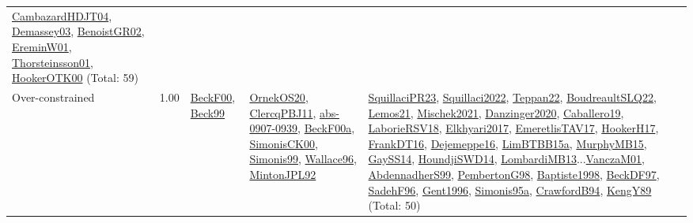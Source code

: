 {\begin{longtable}{p{3cm}r>{\raggedright\arraybackslash}p{6cm}>{\raggedright\arraybackslash}p{6cm}>{\raggedright\arraybackslash}p{8cm}}
\hyperref[detail:CambazardHDJT04]{CambazardHDJT04}, \hyperref[detail:Demassey03]{Demassey03}, \hyperref[detail:BenoistGR02]{BenoistGR02}, \hyperref[detail:EreminW01]{EreminW01}, \hyperref[detail:Thorsteinsson01]{Thorsteinsson01}, \hyperref[detail:HookerOTK00]{HookerOTK00} (Total: 59)\\
\index{Over-constrained}\index{Concepts!Over-constrained}Over-constrained &  1.00 & \hyperref[detail:BeckF00]{BeckF00}, \hyperref[detail:Beck99]{Beck99} & \hyperref[detail:OrnekOS20]{OrnekOS20}, \hyperref[detail:ClercqPBJ11]{ClercqPBJ11}, \hyperref[detail:abs-0907-0939]{abs-0907-0939}, \hyperref[detail:BeckF00a]{BeckF00a}, \hyperref[detail:SimonisCK00]{SimonisCK00}, \hyperref[detail:Simonis99]{Simonis99}, \hyperref[detail:Wallace96]{Wallace96}, \hyperref[detail:MintonJPL92]{MintonJPL92} & \hyperref[detail:SquillaciPR23]{SquillaciPR23}, \hyperref[detail:Squillaci2022]{Squillaci2022}, \hyperref[detail:Teppan22]{Teppan22}, \hyperref[detail:BoudreaultSLQ22]{BoudreaultSLQ22}, \hyperref[detail:Lemos21]{Lemos21}, \hyperref[detail:Mischek2021]{Mischek2021}, \hyperref[detail:Danzinger2020]{Danzinger2020}, \hyperref[detail:Caballero19]{Caballero19}, \hyperref[detail:LaborieRSV18]{LaborieRSV18}, \hyperref[detail:Elkhyari2017]{Elkhyari2017}, \hyperref[detail:EmeretlisTAV17]{EmeretlisTAV17}, \hyperref[detail:HookerH17]{HookerH17}, \hyperref[detail:FrankDT16]{FrankDT16}, \hyperref[detail:Dejemeppe16]{Dejemeppe16}, \hyperref[detail:LimBTBB15a]{LimBTBB15a}, \hyperref[detail:MurphyMB15]{MurphyMB15}, \hyperref[detail:GaySS14]{GaySS14}, \hyperref[detail:HoundjiSWD14]{HoundjiSWD14}, \hyperref[detail:LombardiMB13]{LombardiMB13}...\hyperref[detail:VanczaM01]{VanczaM01}, \hyperref[detail:AbdennadherS99]{AbdennadherS99}, \hyperref[detail:PembertonG98]{PembertonG98}, \hyperref[detail:Baptiste1998]{Baptiste1998}, \hyperref[detail:BeckDF97]{BeckDF97}, \hyperref[detail:SadehF96]{SadehF96}, \hyperref[detail:Gent1996]{Gent1996}, \hyperref[detail:Simonis95a]{Simonis95a}, \hyperref[detail:CrawfordB94]{CrawfordB94}, \hyperref[detail:KengY89]{KengY89} (Total: 50)\\

\end{longtable}}
